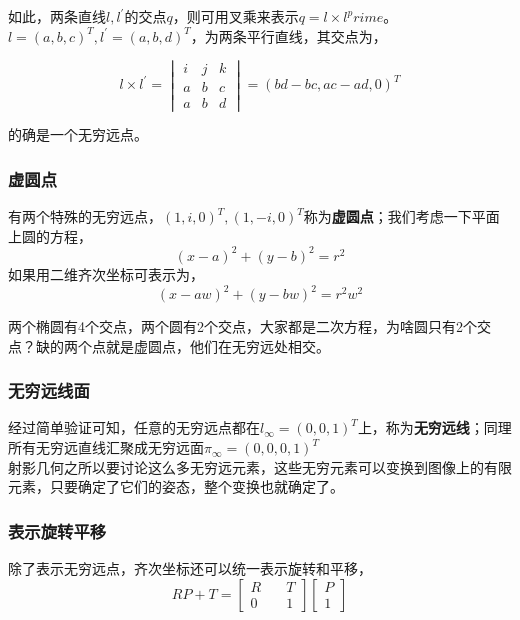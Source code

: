 \documentclass[hpyerref,UTF8,a4paper,titlepage,12pt,oneside]{ctexbook}
\theoremstyle{definition}
\begin{document}
		如此，两条直线$l,l^\prime$的交点$q$，则可用叉乘来表示$q = l\times l^prime$。\\

		$l=(a,b,c)^T, l^\prime = (a,b,d)^T$，为两条平行直线，其交点为，
		
		\begin{equation}
			l\times l^{\prime} = 
							\begin{vmatrix}
								i & j& k \\
								a & b& c\\
								a & b& d
							\end{vmatrix}
			= (bd-bc, ac-ad, 0)^T
		\end{equation}

		的确是一个无穷远点。

	\subsubsection*{虚圆点}		
		有两个特殊的无穷远点，$(1,i,0)^T, (1,-i,0)^T$称为\textbf{虚圆点}；我们考虑一下平面上圆的方程，
		$$
			(x - a)^2 + (y - b)^2 = r^2
		$$
		如果用二维齐次坐标可表示为，
		$$
			(x - aw)^2 + (y - bw)^2 = r^2w^2
		$$

		两个椭圆有4个交点，两个圆有2个交点，大家都是二次方程，为啥圆只有2个交点？缺的两个点就是虚圆点，他们在无穷远处相交。

	\subsubsection*{无穷远线面}
		经过简单验证可知，任意的无穷远点都在$l_{\infty} = (0,0,1)^T$上，称为\textbf{无穷远线}；同理所有无穷远直线汇聚成无穷远面$\pi_{\infty} = (0,0,0,1)^T$\\

		射影几何之所以要讨论这么多无穷远元素，这些无穷元素可以变换到图像上的有限元素，只要确定了它们的姿态，整个变换也就确定了。

	\subsubsection*{表示旋转平移}
	 除了表示无穷远点，齐次坐标还可以统一表示旋转和平移，
	 $$
	 	RP +T = \begin{bmatrix}
	 		R \quad& T\\
	 		0 \quad& 1
	 	\end{bmatrix}
	 	\begin{bmatrix}
	 		P\\
	 		1
	 	\end{bmatrix}
	 $$
\end{document}
